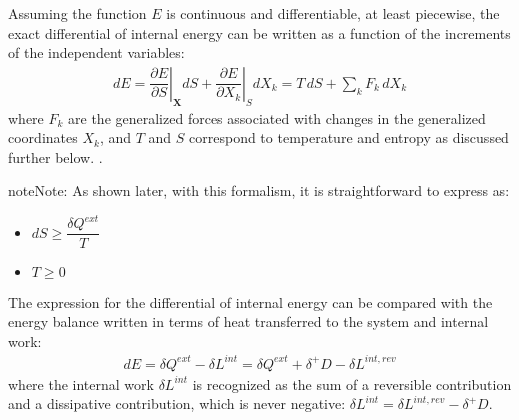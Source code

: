 \documentclass[letterpaper,10pt,english]{jupyterBook}
\begin{document}
\sphinxAtStartPar
Assuming the function \( E \) is continuous and differentiable, at least piecewise, the exact differential of internal energy can be written as a function of the increments of the independent variables:
\begin{equation*}
\begin{split}
dE = \left. \dfrac{\partial E}{\partial S} \right|_{\mathbf{X}} d S + \left. \dfrac{\partial E}{\partial X_k} \right|_{S} d X_k = 
T \, d S + \sum_k F_k \, d X_k
\end{split}
\end{equation*}
\sphinxAtStartPar
where \( F_k \) are the generalized forces associated with changes in the generalized coordinates \( X_k \), and \( T \) and \( S \) correspond to temperature and entropy as discussed further below. .

\begin{sphinxadmonition}{note}{Note:}
\sphinxAtStartPar
As shown later, with this formalism, it is straightforward to express {\hyperref[\detokenize{ch/principles-gibbs-phase-rule:physics-hs-thermodynamics-foundation-principles-gibbs-phase-rule-second}]{}} as:
\begin{itemize}
\item {} 
\sphinxAtStartPar
\( dS \ge \dfrac{\delta Q^{ext}}{T} \)

\item {} 
\sphinxAtStartPar
\( T \ge 0 \)

\end{itemize}
\end{sphinxadmonition}

\sphinxAtStartPar
The expression for the differential of internal energy can be compared with the energy balance written in terms of heat transferred to the system and internal work:
\begin{equation*}
\begin{split}
dE = \delta Q^{ext} - \delta L^{int} = 
\delta Q^{ext} + \delta^+ D - \delta L^{int,rev}
\end{split}
\end{equation*}
\sphinxAtStartPar
where the internal work \( \delta L^{int} \) is recognized as the sum of a reversible contribution and a dissipative contribution, which is never negative: \( \delta L^{int} = \delta L^{int,rev} - \delta^+ D \).
\end{document}
